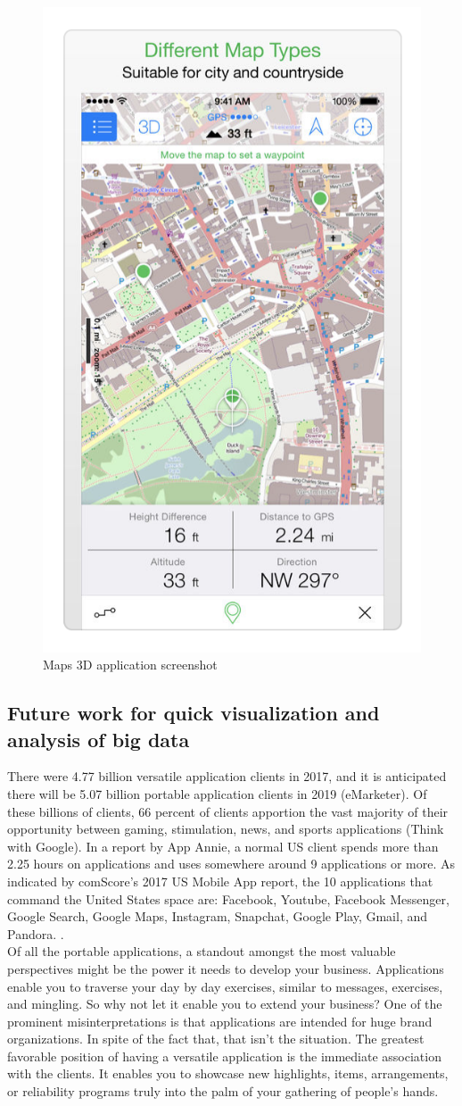 \begin{itemize}
    \begin{figure}[H]
            \centering
            \includegraphics[width=0.25\linewidth]{figures/ch1/map_3d.png}
            \caption{\label{fig:map_3d} Maps 3D application screenshot \cite{Spatial_Agent}}
    \end{figure}
\end{itemize}

  
\subsection{Future work for quick visualization and analysis of big data}

There were 4.77 billion versatile application clients in 2017, and it is anticipated there will be 5.07 billion portable application clients in 2019 (eMarketer). Of these billions of clients, 66 percent of clients apportion the vast majority of their opportunity between gaming, stimulation, news, and sports applications (Think with Google). In a report by App Annie\cite{AppAnnie}, a normal US client spends more than 2.25 hours on applications and uses somewhere around 9 applications or more. As indicated by comScore's 2017 US Mobile App report, the 10 applications that command the United States space are: Facebook, Youtube, Facebook Messenger, Google Search, Google Maps, Instagram, Snapchat, Google Play, Gmail, and Pandora. \cite{eBiz_solutions}. \\
Of all the portable applications, a standout amongst the most valuable perspectives might be the power it needs to develop your business. Applications enable you to traverse your day by day exercises, similar to messages, exercises, and mingling. So why not let it enable you to extend your business? One of the prominent misinterpretations is that applications are intended for huge brand organizations. In spite of the fact that, that isn't the situation. The greatest favorable position of having a versatile application is the immediate association with the clients. It enables you to showcase new highlights, items, arrangements, or reliability programs truly into the palm of your gathering of people's hands.

